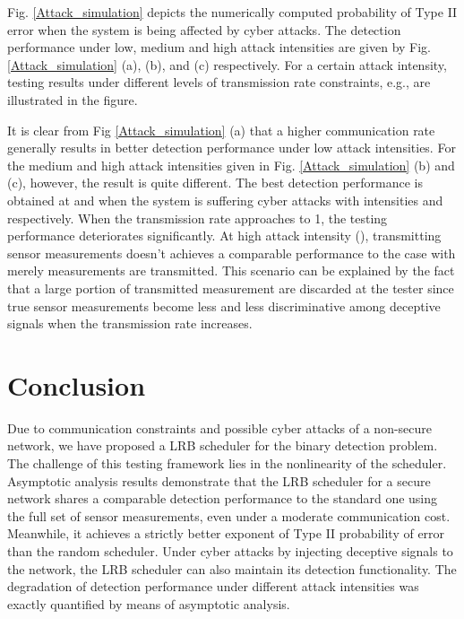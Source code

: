 \documentclass[journal]{IEEEtran}
\begin{document}
Fig. \ref{Attack_simulation} depicts the numerically computed probability of Type II error when the system is being affected by cyber attacks. The detection performance under low, medium and high attack intensities are given by Fig. \ref{Attack_simulation} (a), (b), and (c) respectively. For a certain attack intensity, testing results under different levels of transmission rate constraints, e.g.,  are illustrated in the figure.

It is clear from Fig \ref{Attack_simulation} (a) that a higher communication rate generally results in better detection performance under low attack intensities. For the medium and high attack intensities given in Fig. \ref{Attack_simulation} (b) and (c), however, the result is quite different. The best detection performance is obtained at  and  when the system is suffering cyber attacks with intensities  and  respectively. When the transmission rate approaches to 1, the testing performance deteriorates significantly. At high attack intensity (), transmitting  sensor measurements doesn't achieves a comparable performance to the case with merely  measurements are transmitted. This scenario can be explained by the fact that a large portion of transmitted measurement are discarded at the tester since true sensor measurements become less and less discriminative among deceptive signals when the transmission rate increases.

































\section{Conclusion}

Due to communication constraints and possible cyber attacks of a non-secure network, we have proposed a LRB scheduler for the binary detection problem.  The challenge of this testing framework lies in the nonlinearity of the scheduler.
Asymptotic analysis results demonstrate that the LRB scheduler for a secure network shares a comparable detection performance to the standard one using the full set of sensor measurements, even under a moderate communication cost. Meanwhile,  it achieves a strictly better exponent of  Type II probability of error than the random scheduler. Under cyber attacks by injecting deceptive signals to the network, the LRB scheduler can also maintain its detection functionality. The degradation of detection performance under different attack intensities was exactly quantified by means of asymptotic analysis.
\end{document}
